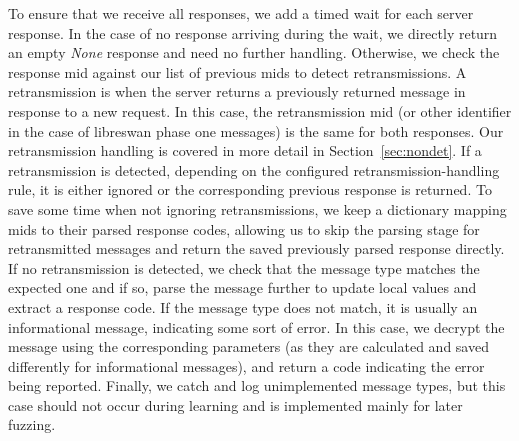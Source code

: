 To ensure that we receive all responses, we add a timed wait for each server response. In the case of no response arriving during the wait, we directly return an empty \textit{None} response and need no further handling. Otherwise, we check the response \ac{mid} against our list of previous \acp{mid} to detect retransmissions. A retransmission is when the server returns a previously returned message in response to a new request. In this case, the retransmission \ac{mid} (or other identifier in the case of libreswan phase one messages) is the same for both responses. Our retransmission handling is covered in more detail in Section~\ref{sec:nondet}. If a retransmission is detected, depending on the configured retransmission-handling rule, it is either ignored or the corresponding previous response is returned. To save some time when not ignoring retransmissions, we keep a dictionary mapping \acp{mid} to their parsed response codes, allowing us to skip the parsing stage for retransmitted messages and return the saved previously parsed response directly. If no retransmission is detected, we check that the message type matches the expected one and if so, parse the message further to update local values and extract a response code. If the message type does not match, it is usually an informational message, indicating some sort of error. In this case, we decrypt the message using the corresponding parameters (as they are calculated and saved differently for informational messages), and return a code indicating the error being reported. Finally, we catch and log unimplemented message types, but this case should not occur during learning and is implemented mainly for later fuzzing.
\newpage

